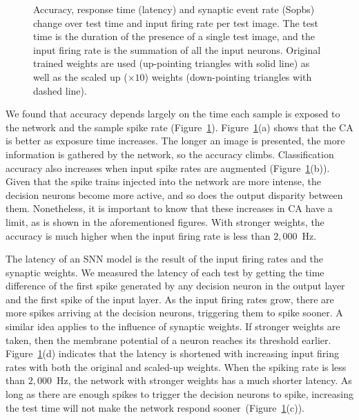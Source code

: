 \begin{figure}[htb!]
	\caption{Accuracy, response time (latency) and synaptic event rate (Sopbs) change over test time and input firing rate per test image.
		The test time is the duration of the presence of a single test image, and the input firing rate is the summation of all the input neurons.
		Original trained weights are used (up-pointing triangles with solid line) as well as the scaled up ($\times10$) weights (down-pointing triangles with dashed line). }
	\label{fig:assess}
\end{figure}

We found that accuracy depends largely on the time each sample is exposed to the network and the sample spike rate (Figure~\ref{fig:assess}).
Figure~\ref{fig:assess}(a) shows that the CA is better as exposure time increases. The longer an image is presented, the more information is gathered by the network, so the accuracy climbs.
Classification accuracy also increases when input spike rates are augmented (Figure~\ref{fig:assess}(b)).
Given that the spike trains injected into the network are more intense, the decision neurons become more active, and so does the output disparity between them.
Nonetheless, it is important to know that these increases in CA have a limit, as is shown in the aforementioned figures.
With stronger weights, the accuracy is much higher when the input firing rate is less than $2,000$~Hz.


The latency of an SNN model is the result of the input firing rates and the synaptic weights.
We measured the latency of each test by getting the time difference of the first spike generated by any decision neuron in the output layer and the first spike of the input layer.
As the input firing rates grow, there are more spikes arriving at the decision neurons, triggering them to spike sooner.
A similar idea applies to the influence of synaptic weights.
If stronger weights are taken, then the membrane potential of a neuron reaches its threshold earlier.
Figure~\ref{fig:assess}(d) indicates that the latency is shortened with increasing input firing rates with both the original and scaled-up weights.
When the spiking rate is less than $2,000$~Hz, the network with stronger weights has a much shorter latency.
As long as there are enough spikes to trigger the decision neurons to spike, increasing the test time will not make the network respond sooner~(Figure~\ref{fig:assess}(c)).

